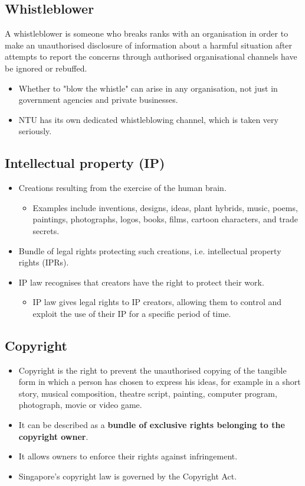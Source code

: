 \documentclass[11pt]{article}
\begin{document}
\subsection{Whistleblower}
\label{sec:orgeae7d3c}
A whistleblower is someone who breaks ranks with an organisation in order to make an unauthorised disclosure of information about a harmful situation after attempts to report the concerns through authorised organisational channels have be ignored or rebuffed.
\begin{itemize}
\item Whether to "blow the whistle" can arise in any organisation, not just in government agencies and private businesses.
\item NTU has its own dedicated whistleblowing channel, which is taken very seriously.
\end{itemize}
\subsection{Intellectual property (IP)}
\label{sec:org70c2433}
\begin{itemize}
\item Creations resulting from the exercise of the human brain.
\begin{itemize}
\item Examples include inventions, designs, ideas, plant hybrids, music, poems, paintings, photographs, logos, books, films, cartoon characters, and trade secrets.
\end{itemize}

\item Bundle of legal rights protecting such creations, i.e. intellectual property rights (IPRs).
\item IP law recognises that creators have the right to protect their work.
\begin{itemize}
\item IP law gives legal rights to IP creators, allowing them to control and exploit the use of their IP for a specific period of time.
\end{itemize}
\end{itemize}
\subsection{Copyright}
\label{sec:org8a3e3d4}
\begin{itemize}
\item Copyright is the right to prevent the unauthorised copying of the tangible form in which a person has chosen to express his ideas, for example in a short story, musical composition, theatre script, painting, computer program, photograph, movie or video game.
\item It can be described as a \textbf{bundle of exclusive rights belonging to the copyright owner}.
\item It allows owners to enforce their rights against infringement.
\item Singapore's copyright law is governed by the Copyright Act.
\end{itemize}
\end{document}
